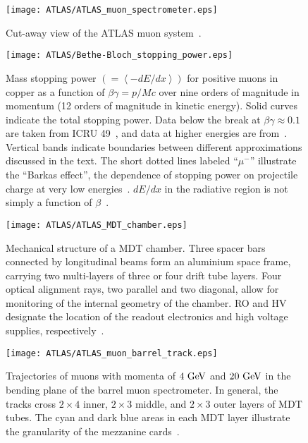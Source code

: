 \begin{figure}[htbp]
 \centering
 \texttt{[image: ATLAS/ATLAS\_muon\_spectrometer.eps]}
 \caption[Cut-away view of the ATLAS muon system.]{%
  Cut-away view of the ATLAS muon system~\cite{PERF-2007-01}.}\label{fig:ATLAS_muon_spectrometer}
\end{figure}

\begin{figure}[htbp]
 \centering
 \texttt{[image: ATLAS/Bethe-Bloch\_stopping\_power.eps]}
 \caption[Mass stopping power for positive muons in copper as a function of $\beta \gamma = p/Mc$.]{%
  Mass stopping power $\left(= \left<-dE/dx\right>\right)$ for positive muons in copper as a function of $\beta \gamma = p/Mc$ over nine orders of magnitude in momentum (12 orders of magnitude in kinetic energy).
  Solid curves indicate the total stopping power.
  Data below the break at $\beta \gamma \approx 0.1$ are taken from ICRU 49~\cite{ICRU49}, and data at higher energies are from~\cite{Groom:2001kq}. Vertical bands indicate boundaries between different approximations discussed in the text.
  The short dotted lines labeled ``$\mu^{-}$'' illustrate the ``Barkas effect'', the dependence of stopping power on projectile charge at very low energies~\cite{PhysRev.101.778}.
  $dE/dx$ in the radiative region is not simply a function of $\beta$~\cite{PDG2018:Ch33}.}\label{fig:Bethe-Bloch_stopping_power}
\end{figure}

\begin{figure}[htbp]
 \centering
 \texttt{[image: ATLAS/ATLAS\_MDT\_chamber.eps]}
 \caption[Mechanical structure of a \gls{MDT} chamber.]{%
  Mechanical structure of a \gls{MDT} chamber.
  Three spacer bars connected by longitudinal beams form an aluminium space frame, carrying two multi-layers of three or four drift tube layers.
  Four optical alignment rays, two parallel and two diagonal, allow for monitoring of the internal geometry of the chamber.
  RO and HV designate the location of the readout electronics and high voltage supplies, respectively~\cite{PERF-2007-01}.}\label{fig:ATLAS_MDT_chamber}
\end{figure}

\begin{figure}[htbp]
 \centering
 \texttt{[image: ATLAS/ATLAS\_muon\_barrel\_track.eps]}
 \caption[Trajectories of muons through the three layers of \glspl{MDT} of the barrel muon spectrometer.]{%
  Trajectories of muons with momenta of $4~\mathrm{GeV}$ and $20~\mathrm{GeV}$ in the bending plane of the barrel muon spectrometer.
  In general, the tracks cross $2 \times 4$ inner, $2 \times 3$ middle, and $2 \times 3$ outer layers of \gls{MDT} tubes.
  The cyan and dark blue areas in each MDT layer illustrate the granularity of the mezzanine cards~\cite{PERF-2007-01}.}\label{fig:ATLAS_muon_barrel_track}
\end{figure}

